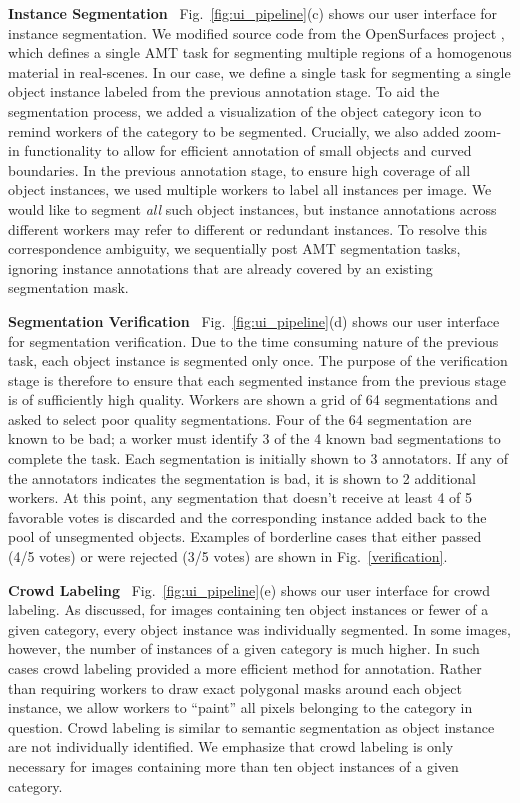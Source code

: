\textbf{Instance Segmentation}~ Fig.~\ref{fig:ui_pipeline}(c) shows our user interface for instance segmentation. We modified source code from the OpenSurfaces project \cite{bell13opensurfaces}, which defines a single AMT task for segmenting multiple regions of a homogenous material in real-scenes. In our case, we define a single task for segmenting a single object instance labeled from the previous annotation stage. To aid the segmentation process, we added a visualization of the object category icon to remind workers of the category to be segmented. Crucially, we also added zoom-in functionality to allow for efficient annotation of small objects and curved boundaries. In the previous annotation stage, to ensure high coverage of all object instances, we used multiple workers to label all instances per image. We would like to segment {\em all} such object instances, but instance annotations across different workers may refer to different or redundant instances. To resolve this correspondence ambiguity, we sequentially post AMT segmentation tasks, ignoring instance annotations that are already covered by an existing segmentation mask.

\textbf{Segmentation Verification}~ Fig.~\ref{fig:ui_pipeline}(d) shows our user interface for segmentation verification. Due to the time consuming nature of the previous task, each object instance is segmented only once. The purpose of the verification stage is therefore to ensure that each segmented instance from the previous stage is of sufficiently high quality. Workers are shown a grid of 64 segmentations and asked to select poor quality segmentations. Four of the 64 segmentation are known to be bad; a worker must identify 3 of the 4 known bad segmentations to complete the task. Each segmentation is initially shown to 3 annotators. If any of the annotators indicates the segmentation is bad, it is shown to 2 additional workers. At this point, any segmentation that doesn't receive at least 4 of 5 favorable votes is discarded and the corresponding instance added back to the pool of unsegmented objects. Examples of borderline cases that either passed (4/5 votes) or were rejected (3/5 votes) are shown in Fig.~\ref{verification}.

\textbf{Crowd Labeling}~ Fig.~\ref{fig:ui_pipeline}(e) shows our user interface for crowd labeling. As discussed, for images containing ten object instances or fewer of a given category, every object instance was individually segmented. In some images, however, the number of instances of a given category is much higher. In such cases crowd labeling provided a more efficient method for annotation. Rather than requiring workers to draw exact polygonal masks around each object instance, we allow workers to ``paint'' all pixels belonging to the category in question. Crowd labeling is similar to semantic segmentation as object instance are not individually identified. We emphasize that crowd labeling is only necessary for images containing more than ten object instances of a given category.

